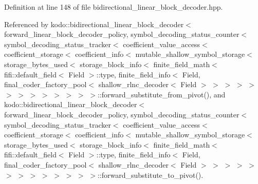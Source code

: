 Definition at line 148 of file bidirectional\-\_\-linear\-\_\-block\-\_\-decoder.\-hpp.



Referenced by kodo\-::bidirectional\-\_\-linear\-\_\-block\-\_\-decoder$<$ forward\-\_\-linear\-\_\-block\-\_\-decoder\-\_\-policy, symbol\-\_\-decoding\-\_\-status\-\_\-counter$<$ symbol\-\_\-decoding\-\_\-status\-\_\-tracker$<$ coefficient\-\_\-value\-\_\-access$<$ coefficient\-\_\-storage$<$ coefficient\-\_\-info$<$ mutable\-\_\-shallow\-\_\-symbol\-\_\-storage$<$ storage\-\_\-bytes\-\_\-used$<$ storage\-\_\-block\-\_\-info$<$ finite\-\_\-field\-\_\-math$<$ fifi\-::default\-\_\-field$<$ Field $>$\-::type, finite\-\_\-field\-\_\-info$<$ Field, final\-\_\-coder\-\_\-factory\-\_\-pool$<$ shallow\-\_\-rlnc\-\_\-decoder$<$ Field $>$ $>$ $>$ $>$ $>$ $>$ $>$ $>$ $>$ $>$ $>$ $>$ $>$\-::forward\-\_\-substitute\-\_\-from\-\_\-pivot(), and kodo\-::bidirectional\-\_\-linear\-\_\-block\-\_\-decoder$<$ forward\-\_\-linear\-\_\-block\-\_\-decoder\-\_\-policy, symbol\-\_\-decoding\-\_\-status\-\_\-counter$<$ symbol\-\_\-decoding\-\_\-status\-\_\-tracker$<$ coefficient\-\_\-value\-\_\-access$<$ coefficient\-\_\-storage$<$ coefficient\-\_\-info$<$ mutable\-\_\-shallow\-\_\-symbol\-\_\-storage$<$ storage\-\_\-bytes\-\_\-used$<$ storage\-\_\-block\-\_\-info$<$ finite\-\_\-field\-\_\-math$<$ fifi\-::default\-\_\-field$<$ Field $>$\-::type, finite\-\_\-field\-\_\-info$<$ Field, final\-\_\-coder\-\_\-factory\-\_\-pool$<$ shallow\-\_\-rlnc\-\_\-decoder$<$ Field $>$ $>$ $>$ $>$ $>$ $>$ $>$ $>$ $>$ $>$ $>$ $>$ $>$\-::forward\-\_\-substitute\-\_\-to\-\_\-pivot().

